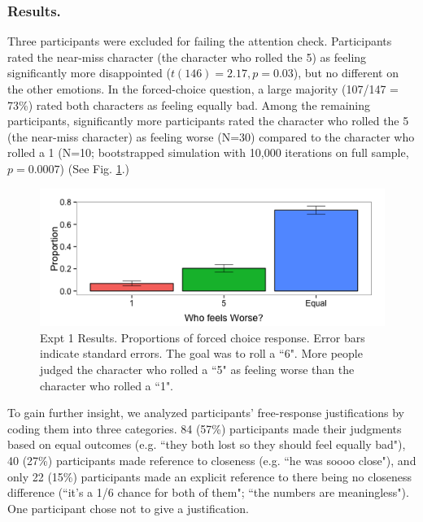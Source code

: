 \documentclass[10pt,letterpaper]{article}
\begin{document}
\subsubsection{Results.} Three participants were excluded for failing the attention check. Participants rated the near-miss character (the character who rolled the 5) as feeling significantly more disappointed ($t(146)=2.17, p=0.03$), but no different on the other emotions. In the forced-choice question, a large majority (107/147 = 73\%) rated both characters as feeling equally bad. Among the remaining participants, significantly more participants rated the character who rolled the 5 (the near-miss character) as feeling worse (N=30) compared to the character who rolled a 1 (N=10; bootstrapped simulation with 10,000 iterations on full sample, $p=0.0007$) (See Fig. \ref{Expt1ResultFig}.)

\begin{figure}[htb!]
\begin{center}\includegraphics[width=\columnwidth]{images/Expt1results.png}\end{center}
\caption{ Expt 1 Results. Proportions of forced choice response. Error bars indicate standard errors. The goal was to roll a ``6". More people judged the character who rolled a ``5" as feeling worse than the character who rolled a ``1".}
\label{Expt1ResultFig}
\end{figure}


	To gain further insight, we analyzed participants' free-response justifications by coding them into three categories. 84 (57\%) participants made their judgments based on equal outcomes (e.g. ``they both lost so they should feel equally bad"), 40 (27\%) participants made reference to closeness (e.g. ``he was soooo close"), and only 22 (15\%) participants made an explicit reference to there being no closeness difference (``it's a 1/6 chance for both of them"; ``the numbers are meaningless"). One participant chose not to give a justification. 
\end{document}
